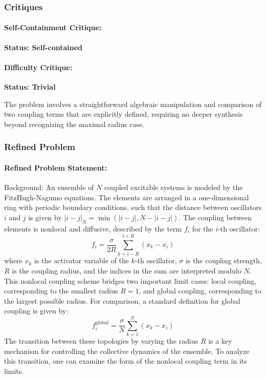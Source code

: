 \documentclass[10pt]{article}
\begin{document}
\subsubsection*{Critiques}
\paragraph*{Self-Containment Critique:}
\textcolor{pass}{\textbf{Status: Self-contained}}




\paragraph*{Difficulty Critique:}
\textcolor{fail}{\textbf{Status: Trivial}}

The problem involves a straightforward algebraic manipulation and comparison of two coupling terms that are explicitly defined, requiring no deeper synthesis beyond recognizing the maximal radius case.


\subsubsection*{Refined Problem}
\paragraph*{Refined Problem Statement:}
Background:
An ensemble of $N$ coupled excitable systems is modeled by the FitzHugh-Nagumo equations. The elements are arranged in a one-dimensional ring with periodic boundary conditions, such that the distance between oscillators $i$ and $j$ is given by $|i-j|_N = \min(|i-j|, N-|i-j|)$. The coupling between elements is nonlocal and diffusive, described by the term $f_i$ for the $i$-th oscillator:
$$f_i = \frac{\sigma}{2R} \sum\limits_{k=i-R}^{i+R}(x_k-x_i)$$
where $x_k$ is the activator variable of the $k$-th oscillator, $\sigma$ is the coupling strength, $R$ is the coupling radius, and the indices in the sum are interpreted modulo $N$. This nonlocal coupling scheme bridges two important limit cases: local coupling, corresponding to the smallest radius $R=1$, and global coupling, corresponding to the largest possible radius. For comparison, a standard definition for global coupling is given by:
$$f_i^{\text{global}} = \frac{\sigma}{N} \sum\limits_{k=1}^{N}(x_k-x_i)$$
The transition between these topologies by varying the radius $R$ is a key mechanism for controlling the collective dynamics of the ensemble. To analyze this transition, one can examine the form of the nonlocal coupling term in its limits.
\end{document}
